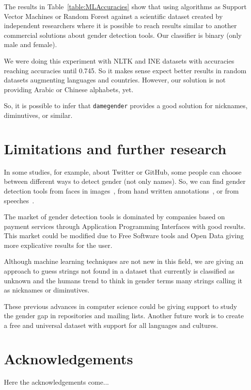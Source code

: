 \documentclass[a4paper]{article}
\begin{document}
The results in Table~\ref{table:MLAccuracies} show that using algorithms as Support Vector Machines or Random Forest against a scientific dataset created by independent researchers where it is possible to reach results similar to another commercial solutions about gender detection tools.
Our classifier is binary (only male and female).

We were doing this experiment with NLTK and INE datasets with accuracies reaching accuracies until 0.745.
So it makes sense expect better results in random datasets augmenting languages and countries.
However, our solution is not providing Arabic or Chinese alphabets, yet.

So, it is possible to infer that \texttt{damegender} provides a good solution for nicknames, diminutives, or similar.


\section{Limitations and further research}

In some studies, for example, about Twitter or GitHub, some people can choose between different ways to detect gender (not only names). 
So, we can find gender detection tools from faces in images~\cite{ranjan2017hyperface}, from hand written annotations~\cite{liwicki2011automatic}, or from speeches~\cite{koppel2002automatically}.


The market of gender detection tools is dominated by companies based on payment services through Application Programming Interfaces with good results. 
This market could be modified due to Free Software tools and Open Data giving more explicative results for the user.

Although machine learning techniques are not new in this field, we are giving an approach to guess strings not found in a dataset that currently is classified as unknown and the humans trend to think in gender terms many strings calling it as nicknames or diminutives.

These previous advances in computer science could be giving support to study the gender gap in repositories and mailing lists.
Another future work is to create a free and universal dataset with support for all languages and cultures.



\section*{Acknowledgements}

Here the acknowledgements come...

 

\end{document}
